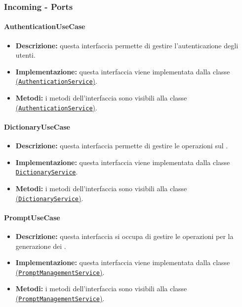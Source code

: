 \subsubsection{Incoming - Ports}

\paragraph{AuthenticationUseCase} \label{AuthenticationUseCase}
\begin{itemize}
    \item \textbf{Descrizione:} questa interfaccia permette di gestire l'autenticazione degli utenti. 
    \item \textbf{Implementazione:} questa interfaccia viene implementata dalla classe \hyperref[AuthenticationService]{(\texttt{AuthenticationService})}. 
    \item \textbf{Metodi:} i metodi dell'interfaccia sono visibili alla classe \hyperref[AuthenticationService]{(\texttt{AuthenticationService})}.
\end{itemize}  

\paragraph{DictionaryUseCase} \label{DictionaryUseCase}
\begin{itemize}
    \item \textbf{Descrizione:} questa interfaccia permette di gestire le operazioni sul .
    \item \textbf{Implementazione:} questa interfaccia viene implementata dalla classe \hyperref[DictionaryService]{\texttt{DictionaryService}}.
    \item \textbf{Metodi:} i metodi dell'interfaccia sono visibili alla classe \hyperref[DictionaryService]{(\texttt{DictionaryService})}.
\end{itemize}  

\paragraph{PromptUseCase} \label{PromptUseCase}
\begin{itemize}
    \item \textbf{Descrizione:} questa interfaccia si occupa di gestire le operazioni per la generazione dei .
    \item \textbf{Implementazione:} questa interfaccia viene implementata dalla classe \hyperref[PromptManagementService]{(\texttt{PromptManagementService})}.
    \item \textbf{Metodi:} i metodi dell'interfaccia sono visibili alla classe \hyperref[PromptManagementService]{(\texttt{PromptManagementService})}.
\end{itemize}  

